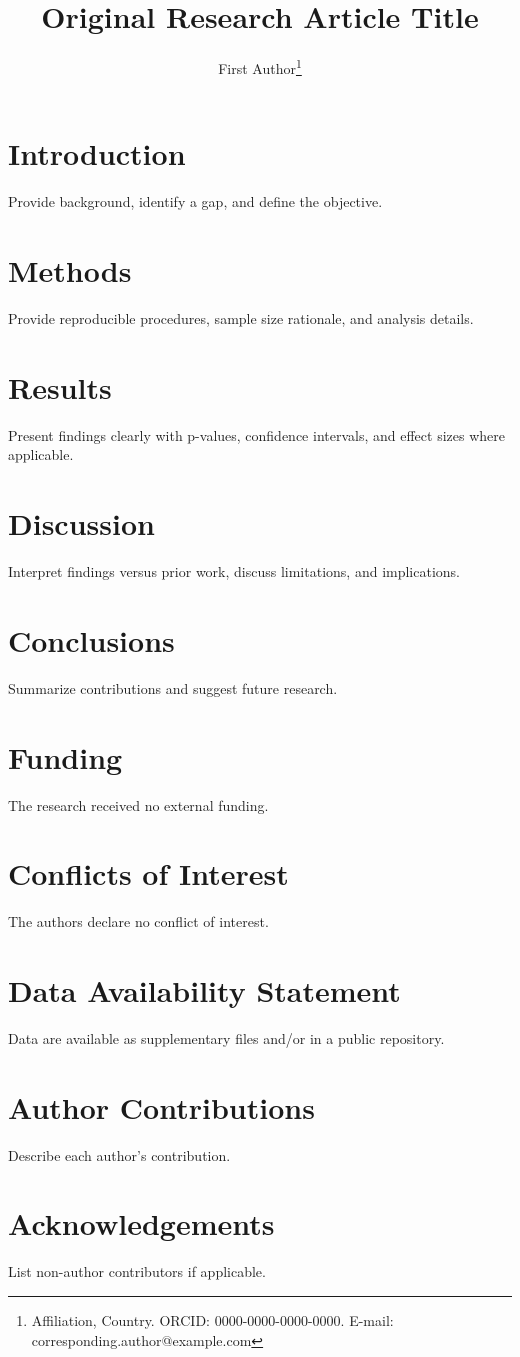 \documentclass[12pt,a4paper]{article}
\title{Original Research Article Title}
\author{First Author\footnote{Affiliation, Country. ORCID: 0000-0000-0000-0000. E-mail: corresponding.author@example.com}}
\date{}
\begin{document}
\maketitle

\begin{sdqabstract}
\end{sdqabstract}


\section{Introduction}
Provide background, identify a gap, and define the objective.

\section{Methods}
Provide reproducible procedures, sample size rationale, and analysis details.

\section{Results}
Present findings clearly with p-values, confidence intervals, and effect sizes where applicable.

\section{Discussion}
Interpret findings versus prior work, discuss limitations, and implications.

\section{Conclusions}
Summarize contributions and suggest future research.

\section*{Funding}
The research received no external funding.

\section*{Conflicts of Interest}
The authors declare no conflict of interest.

\section*{Data Availability Statement}
Data are available as supplementary files and/or in a public repository.

\section*{Author Contributions}
Describe each author's contribution.

\section*{Acknowledgements}
List non-author contributors if applicable.

\printbibliography[title={References}]
\end{document}
